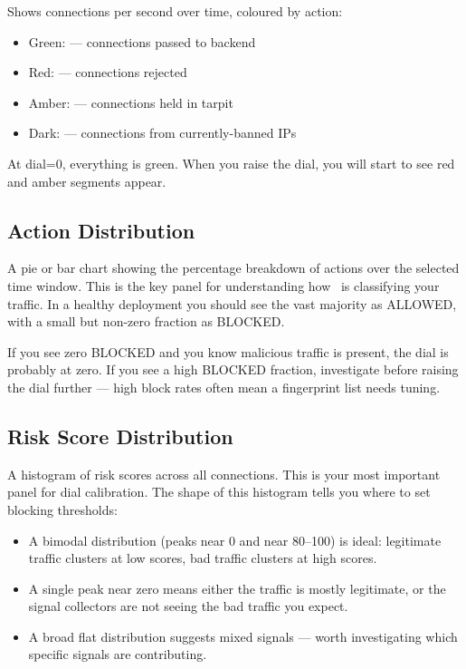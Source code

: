 Shows connections per second over time, coloured by action:
\begin{itemize}
  \item Green: \badgeallow{} — connections passed to backend
  \item Red: \badgeblock{} — connections rejected
  \item Amber: \badgetarpit{} — connections held in tarpit
  \item Dark: \badgeban{} — connections from currently-banned IPs
\end{itemize}

At dial=0, everything is green. When you raise the dial, you will start to see
red and amber segments appear.

\subsection{Action Distribution}

A pie or bar chart showing the percentage breakdown of actions over the selected
time window. This is the key panel for understanding how \ja\ is classifying
your traffic. In a healthy deployment you should see the vast majority as ALLOWED,
with a small but non-zero fraction as BLOCKED.

If you see zero BLOCKED and you know malicious traffic is present, the dial is
probably at zero. If you see a high BLOCKED fraction, investigate before raising
the dial further — high block rates often mean a fingerprint list needs tuning.

\subsection{Risk Score Distribution}

A histogram of risk scores across all connections. This is your most important
panel for dial calibration. The shape of this histogram tells you where to set
blocking thresholds:

\begin{itemize}
  \item A bimodal distribution (peaks near 0 and near 80--100) is ideal: legitimate
    traffic clusters at low scores, bad traffic clusters at high scores.
  \item A single peak near zero means either the traffic is mostly legitimate, or
    the signal collectors are not seeing the bad traffic you expect.
  \item A broad flat distribution suggests mixed signals — worth investigating
    which specific signals are contributing.
\end{itemize}

